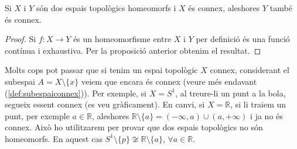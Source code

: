\documentclass[../main.tex]{subfiles}
\begin{document}
\begin{coro}
\label{coro:propietatespaisconnexos1} Si $X$ i $Y$ són dos espais topològics homeomorfs i $X$ és connex, aleshores $Y$ també és connex.
\end{coro}
\begin{proof}
Si $f:X\rightarrow Y$ és un homeomorfisme entre $X$ i $Y$ per definició és una funció contínua i exhaustiva. Per la proposició anterior obtenim el resultat.
\end{proof}

Molts cops pot passar que si tenim un espai topològic $X$ connex, considerant el subespai $A = X\setminus\{x\}$ veiem que encara és connex (veure més endavant (\ref{def:subespaiconnex})). Per exemple, si $X = S^1$, al treure-li un punt a la bola, segueix essent connex (es veu gràficament). En canvi, si $X = \mathbb{R}$, si li traiem un punt, per exemple $a\in\mathbb{R}$, aleshores $\mathbb{R}\setminus \{a\} = (-\infty,a)\cup (a,+\infty)$ i ja no és connex. Això ho utilitzarem per provar que dos espais topològics no són homeomorfs. En aquest cas $S^1\setminus\{p\}\not\cong \mathbb{R}\setminus\{a\}$, $\forall a\in\mathbb{R}$.
\end{document}
